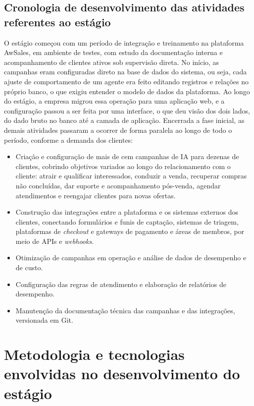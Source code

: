 \documentclass[12pt,a4paper,oneside]{article}
\begin{document}
\subsection{Cronologia de desenvolvimento das atividades referentes ao estágio}

O estágio começou com um período de integração e treinamento na plataforma AwSales, em ambiente de testes, com estudo da documentação interna e acompanhamento de clientes ativos sob supervisão direta. No início, as campanhas eram configuradas direto na base de dados do sistema, ou seja, cada ajuste de comportamento de um agente era feito editando registros e relações no próprio banco, o que exigiu entender o modelo de dados da plataforma. Ao longo do estágio, a empresa migrou essa operação para uma aplicação web, e a configuração passou a ser feita por uma interface, o que deu visão dos dois lados, do dado bruto no banco até a camada de aplicação. Encerrada a fase inicial, as demais atividades passaram a ocorrer de forma paralela ao longo de todo o período, conforme a demanda dos clientes:

\begin{itemize}[leftmargin=2em,topsep=0pt]
  \item Criação e configuração de mais de cem campanhas de IA para dezenas de clientes, cobrindo objetivos variados ao longo do relacionamento com o cliente: atrair e qualificar interessados, conduzir a venda, recuperar compras não concluídas, dar suporte e acompanhamento pós-venda, agendar atendimentos e reengajar clientes para novas ofertas.
  \item Construção das integrações entre a plataforma e os sistemas externos dos clientes, conectando formulários e funis de captação, sistemas de triagem, plataformas de \textit{checkout} e gateways de pagamento e áreas de membros, por meio de APIs e \textit{webhooks}.
  \item Otimização de campanhas em operação e análise de dados de desempenho e de custo.
  \item Configuração das regras de atendimento e elaboração de relatórios de desempenho.
  \item Manutenção da documentação técnica das campanhas e das integrações, versionada em Git.
\end{itemize}

\section{Metodologia e tecnologias envolvidas no desenvolvimento do estágio}
\end{document}
